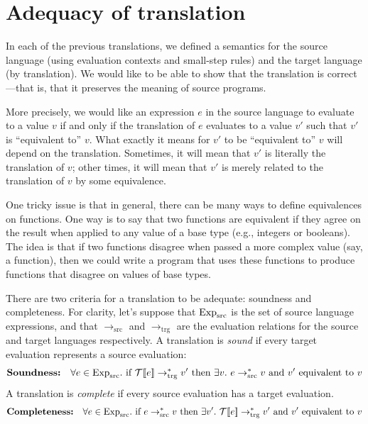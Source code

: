 \section{Adequacy of translation}

In each of the previous translations, we defined a semantics for the source language (using
evaluation contexts and small-step rules) and the target language (by translation). We would like
to be able to show that the translation is correct---that is, that it preserves the meaning of
source programs.

More precisely, we would like an expression $e$ in the source language to evaluate to a value $v$
if and only if the translation of $e$ evaluates to a value $v'$ such that $v'$ is ``equivalent to''
$v$. What exactly it means for $v'$ to be ``equivalent to'' $v$ will depend on the translation.
Sometimes, it will mean that $v'$ is literally the translation of $v$; other times, it will mean
that $v'$ is merely related to the translation of $v$ by some equivalence.

One tricky issue is that in general, there can be many ways to define equivalences on functions.
One way is to say that two functions are equivalent if they agree on the result when applied to any
value of a base type (e.g., integers or booleans). The idea is that if two functions disagree when
passed a more complex value (say, a function), then we could write a program that uses these
functions to produce functions that disagree on values of base types.

There are two criteria for a translation to be adequate: soundness and completeness. For clarity,
let's suppose that $\mathrm{Exp}_{\mathrm{src}}$ is the set of source language expressions, and that
$\to_{\mathrm{src}}$ and $\to_{\mathrm{trg}}$ are the evaluation relations for the source and target
languages respectively. A translation is \emph{sound} if every target evaluation represents a
source evaluation:
\[
  \textbf{Soundness:}\quad\forall e\in\mathrm{Exp}_{\mathrm{src}}.\ \text{if }\mathcal{T}[\![e]\!]\to^*_{\mathrm{trg}}v'
  \text{ then }\exists v.\ e\to^*_{\mathrm{src}}v\text{ and }v'\text{ equivalent to }v
\]
A translation is \emph{complete} if every source evaluation has a target evaluation.
\[
  \textbf{Completeness:}\quad\forall e\in\mathrm{Exp}_{\mathrm{src}}.\ \text{if }e\to^*_{\mathrm{src}}v
  \text{ then }\exists v'.\ \mathcal{T}[\![e]\!]\to^*_{\mathrm{trg}}v'\text{ and }v'\text{ equivalent to }v
\]

% 
